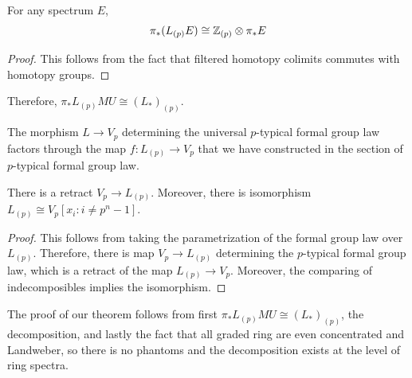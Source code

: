 \begin{corollary}
    For any spectrum $E$, 
    \[
    \pi_*(L_{(p)}E)\cong \mathbb{Z}_{(p)}\otimes \pi_*E
    \]
\end{corollary}
\begin{proof}
    This follows from the fact that filtered homotopy colimits commutes with homotopy groups.
\end{proof}

Therefore, $\pi_*L_{(p)}MU\cong (L_*)_{(p)}$.

The morphism $L\to V_p$ determining the universal $p$-typical formal group law factors through the map $f:L_{(p)}\to V_p$ that we have constructed in the section of $p$-typical formal group law. 
\begin{lemma}
    There is a retract $V_p\to L_{(p)}$. Moreover, there is isomorphism $L_{(p)}\cong V_p[x_i: i\neq p^n-1]$.
\end{lemma}
\begin{proof}
    This follows from taking the parametrization of the formal group law over $L_{(p)}$. Therefore, there is map $V_p\to L_{(p)}$ 
    determining the $p$-typical formal group law, which is a retract of the map $L_{(p)}\to V_p$. Moreover, the comparing of 
    indecomposibles implies the isomorphism.
\end{proof}

The proof of our theorem follows from first $\pi_*L_{(p)}MU\cong (L_*)_{(p)}$, the decomposition, and lastly the fact that all graded ring are even concentrated and Landweber, so there is no phantoms and the decomposition exists at the level of ring spectra.
